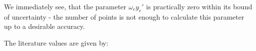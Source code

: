 














We immediately see, that the parameter $\omega_e y_e'$ is practically zero within its 
bound of uncertainty - the number of points is not enough to calculate this parameter 
up to a desirable accuracy. 


The literature values are given by:


